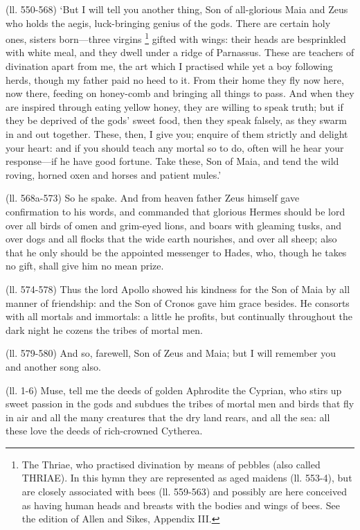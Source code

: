 (ll. 550-568) ‘But I will tell you another thing, Son of all-glorious
Maia and Zeus who holds the aegis, luck-bringing genius of the gods. There are
certain holy ones, sisters born—three virgins \footnote{The Thriae, who practised
divination by means of pebbles (also called THRIAE). In this hymn they are
represented as aged maidens (ll. 553-4), but are closely associated with bees
(ll. 559-563) and possibly are here conceived as having human heads and breasts
with the bodies and wings of bees. See the edition of Allen and Sikes, Appendix
III.} gifted
with wings: their heads are besprinkled with white meal, and they dwell under a
ridge of Parnassus. These are teachers of divination apart from me, the art
which I practised while yet a boy following herds, though my father paid no
heed to it. From their home they fly now here, now there, feeding on honey-comb
and bringing all things to pass. And when they are inspired through eating
yellow honey, they are willing to speak truth; but if they be deprived of the
gods’ sweet food, then they speak falsely, as they swarm in and out
together. These, then, I give you; enquire of them strictly and delight your
heart: and if you should teach any mortal so to do, often will he hear your
response—if he have good fortune. Take these, Son of Maia, and tend the
wild roving, horned oxen and horses and patient mules.’

(ll. 568a-573) So he spake. And from heaven father Zeus himself gave
confirmation to his words, and commanded that glorious Hermes should be lord
over all birds of omen and grim-eyed lions, and boars with gleaming tusks, and
over dogs and all flocks that the wide earth nourishes, and over all sheep;
also that he only should be the appointed messenger to Hades, who, though he
takes no gift, shall give him no mean prize.

(ll. 574-578) Thus the lord Apollo showed his kindness for the Son of Maia by
all manner of friendship: and the Son of Cronos gave him grace besides. He
consorts with all mortals and immortals: a little he profits, but continually
throughout the dark night he cozens the tribes of mortal men.

(ll. 579-580) And so, farewell, Son of Zeus and Maia; but I will remember you
and another song also.


(ll. 1-6) Muse, tell me the deeds of golden Aphrodite the Cyprian, who stirs up
sweet passion in the gods and subdues the tribes of mortal men and birds that
fly in air and all the many creatures that the dry land rears, and all the sea:
all these love the deeds of rich-crowned Cytherea.

